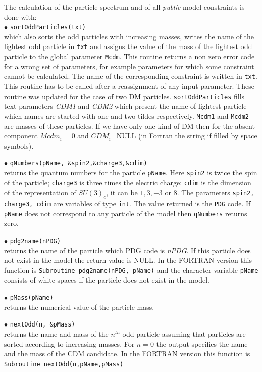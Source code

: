 \documentclass[12pt,a4paper]{article}
\begin{document}
The calculation of the particle spectrum and of all  {\it public} model constraints 
is  done with:\\
\noindent
 $\bullet$ \verb|sortOddParticles(txt)|\\
which also sorts the odd
particles with increasing  masses,  writes the name of the lightest odd particle 
in \verb|txt| and    assigns  the value of the mass  of
the lightest odd particle to the global parameter \verb|Mcdm|.
This routine returns a non zero error code for a
wrong set of parameters, for example parameters  for which some
constraint cannot be calculated.
The name of the corresponding constraint is
written in \verb|txt|. This routine has to be called after a reassignment of any input parameter.
These routine was updated for the case of two DM particles.  {\tt sortOddParticles} fills  text parameters  {\it CDM1} and {\it CDM2} 
which present the name of lightest  particle  which  names are started with one and two tildes respectively. {\tt Mcdm1} and {\tt Mcdm2} are masses of these
particles. If we have only one kind of DM  then  for the absent  component
$Mcdm_i=0$ and   $CDM_i$=NULL (in Fortran  the string  if filled by space symbols). 
 


\noindent 
$\bullet$ \verb|qNumbers(pName, &spin2,&charge3,&cdim)|\\
returns the quantum numbers for the particle \verb|pName|. Here \verb|spin2| is twice the spin of the particle; \verb|charge3| is 
three times the electric charge; \verb|cdim| is the  dimension of the representation
of $SU(3)_c$, it can be $1,3,-3$ or $8$. The parameters {\tt spin2, charge3, cdim} are 
variables of type {\tt int}. The value returned 
is the {\tt PDG} code. If \verb|pName| does not correspond to any
particle of the model then \verb|qNumbers| returns zero.


\noindent
$\bullet$  \verb|pdg2name(nPDG)| \\
returns  the name of  the particle which PDG code is {\it nPDG}. If this particle does not exist in the model
the return value is NULL.  In the FORTRAN version this function
is \verb|Subroutine pdg2name(nPDG, pName)| and the character variable
\verb|pName| consists of white
spaces if the particle does not exist in the model. 

\noindent
$\bullet$  \verb|pMass(pName)| \\
returns  the numerical value of the particle mass.

\noindent
$\bullet$  \verb|nextOdd(n, &pMass)| \\
returns the name and mass of the $n^{th}$ odd particle assuming that particles are 
sorted according to increasing masses. For $n=0$ the output specifies the 
name and the mass of the CDM candidate. In the FORTRAN version this function 
is \verb|Subroutine nextOdd(n,pName,pMass)| 
\end{document}
